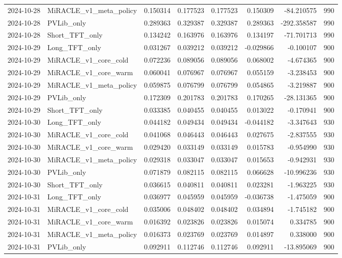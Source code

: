 \begin{tabular}{llrrrrrr}
2024-10-28 & MiRACLE_v1_meta_policy & 0.150314 & 0.177523 & 0.177523 & 0.150309 & -84.210575 & 990 \\
2024-10-28 & PVLib_only & 0.289363 & 0.329387 & 0.329387 & 0.289363 & -292.358587 & 990 \\
2024-10-28 & Short_TFT_only & 0.134242 & 0.163976 & 0.163976 & 0.134197 & -71.701713 & 990 \\
2024-10-29 & Long_TFT_only & 0.031267 & 0.039212 & 0.039212 & -0.029866 & -0.100107 & 900 \\
2024-10-29 & MiRACLE_v1_core_cold & 0.072236 & 0.089056 & 0.089056 & 0.068002 & -4.674365 & 900 \\
2024-10-29 & MiRACLE_v1_core_warm & 0.060041 & 0.076967 & 0.076967 & 0.055159 & -3.238453 & 900 \\
2024-10-29 & MiRACLE_v1_meta_policy & 0.059875 & 0.076799 & 0.076799 & 0.054865 & -3.219887 & 900 \\
2024-10-29 & PVLib_only & 0.172309 & 0.201783 & 0.201783 & 0.170265 & -28.131365 & 900 \\
2024-10-29 & Short_TFT_only & 0.033385 & 0.040455 & 0.040455 & 0.013022 & -0.170941 & 900 \\
2024-10-30 & Long_TFT_only & 0.044182 & 0.049434 & 0.049434 & -0.044182 & -3.347643 & 930 \\
2024-10-30 & MiRACLE_v1_core_cold & 0.041068 & 0.046443 & 0.046443 & 0.027675 & -2.837555 & 930 \\
2024-10-30 & MiRACLE_v1_core_warm & 0.029420 & 0.033149 & 0.033149 & 0.015783 & -0.954990 & 930 \\
2024-10-30 & MiRACLE_v1_meta_policy & 0.029318 & 0.033047 & 0.033047 & 0.015653 & -0.942931 & 930 \\
2024-10-30 & PVLib_only & 0.071879 & 0.082115 & 0.082115 & 0.066628 & -10.996236 & 930 \\
2024-10-30 & Short_TFT_only & 0.036615 & 0.040811 & 0.040811 & 0.023281 & -1.963225 & 930 \\
2024-10-31 & Long_TFT_only & 0.036977 & 0.045959 & 0.045959 & -0.036738 & -1.475059 & 900 \\
2024-10-31 & MiRACLE_v1_core_cold & 0.035006 & 0.048402 & 0.048402 & 0.034894 & -1.745182 & 900 \\
2024-10-31 & MiRACLE_v1_core_warm & 0.016392 & 0.023826 & 0.023826 & 0.015074 & 0.334785 & 900 \\
2024-10-31 & MiRACLE_v1_meta_policy & 0.016373 & 0.023769 & 0.023769 & 0.014897 & 0.338000 & 900 \\
2024-10-31 & PVLib_only & 0.092911 & 0.112746 & 0.112746 & 0.092911 & -13.895069 & 900 \\

\end{tabular}
